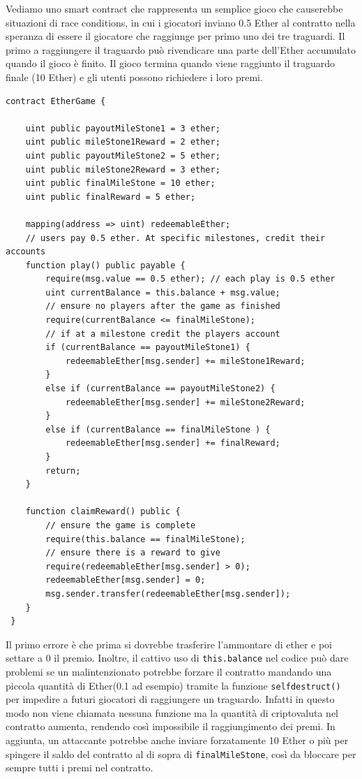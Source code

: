 Vediamo uno smart contract che rappresenta un semplice gioco che causerebbe situazioni di race conditions, in cui i giocatori inviano 0.5 Ether al contratto nella speranza di essere il giocatore che raggiunge per primo uno dei tre traguardi. Il primo a raggiungere il traguardo può rivendicare una parte dell'Ether accumulato quando il gioco è finito. Il gioco termina quando viene raggiunto il traguardo finale (10 Ether) e gli utenti possono richiedere i loro premi.
\begin{lstlisting}[language=Solidity]
contract EtherGame {
    
    uint public payoutMileStone1 = 3 ether;
    uint public mileStone1Reward = 2 ether;
    uint public payoutMileStone2 = 5 ether;
    uint public mileStone2Reward = 3 ether; 
    uint public finalMileStone = 10 ether; 
    uint public finalReward = 5 ether; 
    
    mapping(address => uint) redeemableEther;
    // users pay 0.5 ether. At specific milestones, credit their accounts
    function play() public payable {
        require(msg.value == 0.5 ether); // each play is 0.5 ether
        uint currentBalance = this.balance + msg.value;
        // ensure no players after the game as finished
        require(currentBalance <= finalMileStone);
        // if at a milestone credit the players account
        if (currentBalance == payoutMileStone1) {
            redeemableEther[msg.sender] += mileStone1Reward;
        }
        else if (currentBalance == payoutMileStone2) {
            redeemableEther[msg.sender] += mileStone2Reward;
        }
        else if (currentBalance == finalMileStone ) {
            redeemableEther[msg.sender] += finalReward;
        }
        return;
    }
    
    function claimReward() public {
        // ensure the game is complete
        require(this.balance == finalMileStone);
        // ensure there is a reward to give
        require(redeemableEther[msg.sender] > 0); 
        redeemableEther[msg.sender] = 0;
        msg.sender.transfer(redeemableEther[msg.sender]);
    }
 }
\end{lstlisting}

Il primo errore è che prima si dovrebbe trasferire l'ammontare di ether e poi settare a 0 il premio. Inoltre, il cattivo uso di \texttt{this.balance} nel codice può dare problemi se un malintenzionato potrebbe forzare il contratto mandando una piccola quantità di Ether(0.1 ad esempio) tramite la funzione \texttt{selfdestruct()} per impedire a futuri giocatori di raggiungere un traguardo. Infatti in questo modo non viene chiamata nessuna funzione ma la quantità di criptovaluta nel contratto aumenta, rendendo così impossibile il raggiungimento dei premi. In aggiunta, un attaccante potrebbe anche inviare forzatamente 10 Ether o più per spingere il saldo del contratto al di sopra di \texttt{finalMileStone}, così da bloccare per sempre tutti i premi nel contratto.

